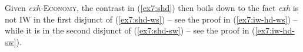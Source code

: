 %


Given \textit{exh-}\textsc{Economy}, the contrast in (\ref{ex7:shd}) then boils down to the fact \textit{exh} is not IW in the first disjunct of (\ref{ex7:shd-ws}) -- see the proof in (\ref{ex7:iw-hd-ws}) -- while it is in the second disjunct of (\ref{ex7:shd-sw}) -- see the proof in (\ref{ex7:iw-hd-sw}).


